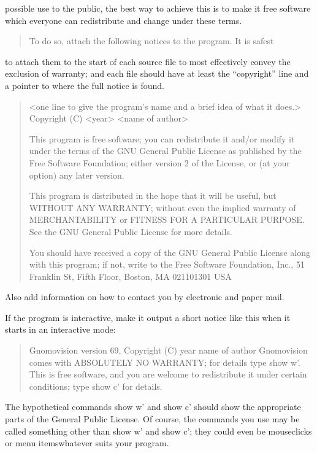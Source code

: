 \documentclass[letterpaper,10pt,english]{sphinxmanual}
\begin{document}
possible use to the public, the best way to achieve this is to make it
free software which everyone can redistribute and change under these terms.
\begin{quote}

To do so, attach the following notices to the program.  It is safest
\end{quote}

to attach them to the start of each source file to most effectively
convey the exclusion of warranty; and each file should have at least
the “copyright” line and a pointer to where the full notice is found.
\begin{quote}

\textless{}one line to give the program’s name and a brief idea of what it does.\textgreater{}
Copyright (C) \textless{}year\textgreater{}  \textless{}name of author\textgreater{}

This program is free software; you can redistribute it and/or modify
it under the terms of the GNU General Public License as published by
the Free Software Foundation; either version 2 of the License, or
(at your option) any later version.

This program is distributed in the hope that it will be useful,
but WITHOUT ANY WARRANTY; without even the implied warranty of
MERCHANTABILITY or FITNESS FOR A PARTICULAR PURPOSE.  See the
GNU General Public License for more details.

You should have received a copy of the GNU General Public License
along with this program; if not, write to the Free Software
Foundation, Inc., 51 Franklin St, Fifth Floor, Boston, MA  02110\sphinxhyphen{}1301  USA
\end{quote}

Also add information on how to contact you by electronic and paper mail.

If the program is interactive, make it output a short notice like this
when it starts in an interactive mode:
\begin{quote}

Gnomovision version 69, Copyright (C) year name of author
Gnomovision comes with ABSOLUTELY NO WARRANTY; for details type {\color{red}\bfseries{}\textasciigrave{}}show w’.
This is free software, and you are welcome to redistribute it
under certain conditions; type {\color{red}\bfseries{}\textasciigrave{}}show c’ for details.
\end{quote}

The hypothetical commands {\color{red}\bfseries{}\textasciigrave{}}show w’ and {\color{red}\bfseries{}\textasciigrave{}}show c’ should show the appropriate
parts of the General Public License.  Of course, the commands you use may
be called something other than {\color{red}\bfseries{}\textasciigrave{}}show w’ and {\color{red}\bfseries{}\textasciigrave{}}show c’; they could even be
mouse\sphinxhyphen{}clicks or menu items\textendash{}whatever suits your program.
\end{document}
